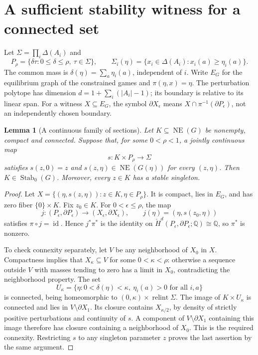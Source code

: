 \documentclass[11pt]{article}
\newcommand{\NE}{\operatorname{NE}}
\newcommand{\Stab}{\operatorname{Stab}_0}
\newcommand{\relint}{\operatorname{relint}}
\newcommand{\Q}{\mathbb Q}
\newtheorem{lemma}[theorem]{Lemma}
\theoremstyle{definition}
\theoremstyle{remark}
\begin{document}
\section{A sufficient stability witness for a connected set}
Let $\Sigma=\prod_i\Delta(A_i)$ and
\[
 P_\rho=\{\delta\tau:0\le\delta\le\rho,\ \tau\in\Sigma\},\qquad
 \Sigma_i(\eta)=\{x_i\in\Delta(A_i):x_i(a)\ge\eta_i(a)\}.
\]
The common mass is $\delta(\eta)=\sum_a\eta_i(a)$, independent of $i$.
Write $E_G$ for the equilibrium graph of the constrained games and
$\pi(\eta,x)=\eta$. The perturbation polytope has dimension
$d=1+\sum_i(|A_i|-1)$; its boundary is relative to its linear span.
For a witness $X\subseteq E_G$, the symbol $\partial X_\epsilon$ means
$X\cap\pi^{-1}(\partial P_\epsilon)$, not an independently chosen boundary.

\begin{lemma}[A continuous family of sections]\label{lem:family}
Let $K\subseteq\NE(G)$ be nonempty, compact and connected. Suppose that,
for some $0<\rho<1$, a jointly continuous map
\[
 s:K\times P_\rho\longrightarrow\Sigma
\]
satisfies $s(z,0)=z$ and $s(z,\eta)\in\NE(G(\eta))$ for every
$(z,\eta)$. Then $K\in\Stab(G)$. Moreover, every $z\in K$ has a
stable singleton.
\end{lemma}
\begin{proof}
Let $X=\{(\eta,s(z,\eta)):z\in K,\eta\in P_\rho\}$.
It is compact, lies in $E_G$, and has zero fiber $\{0\}\times K$.
Fix $z_0\in K$. For $0<\epsilon\le\rho$, the map
\[
 j:(P_\epsilon,\partial P_\epsilon)\longrightarrow
       (X_\epsilon,\partial X_\epsilon),
 \qquad j(\eta)=(\eta,s(z_0,\eta))
\]
satisfies $\pi\circ j=\operatorname{id}$. Hence $j^*\pi^*$ is the
identity on $\check H^d(P_\epsilon,\partial P_\epsilon;\Q)\cong\Q$,
so $\pi^*$ is nonzero.

To check connexity separately, let $V$ be any neighborhood of $X_0$ in
$X$. Compactness implies that $X_\kappa\subseteq V$ for some
$0<\kappa<\rho$: otherwise a sequence outside $V$ with masses tending
to zero has a limit in $X_0$, contradicting the neighborhood property.
The set
\[
 U_\kappa=\{\eta:0<\delta(\eta)<\kappa,\ \eta_i(a)>0\text{ for all }i,a\}
\]
is connected, being homeomorphic to
$(0,\kappa)\times\relint\Sigma$. The image of $K\times U_\kappa$
is connected and lies in $V\setminus\partial X_1$. Its closure contains
$X_{\kappa/2}$, by density of strictly positive perturbations and continuity
of $s$. A component of $V\setminus\partial X_1$ containing this image
therefore has closure containing a neighborhood of $X_0$. This is the
required connexity. Restricting $s$ to any singleton parameter $z$ proves
the last assertion by the same argument.
\end{proof}
\end{document}
